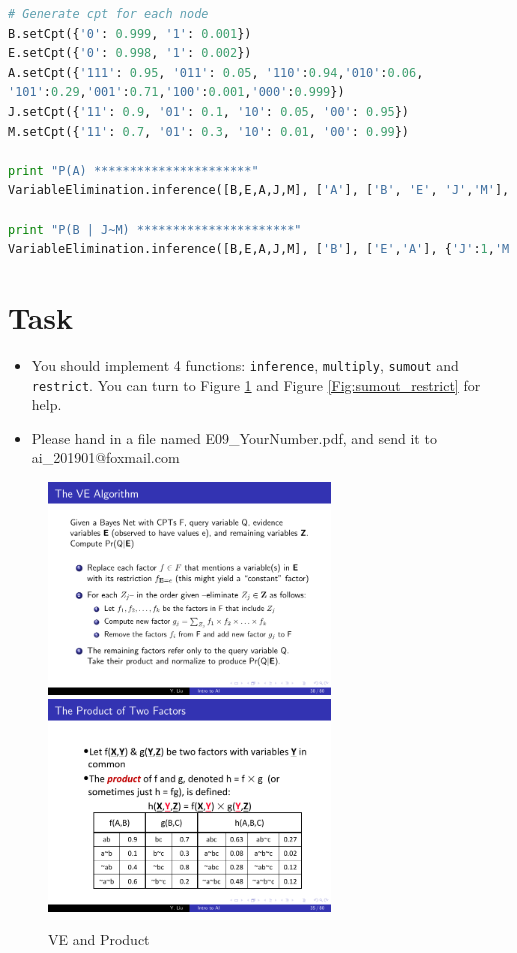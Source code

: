 \documentclass[a4paper, 11pt]{article}
\begin{document}
\begin{lstlisting}[language=Python,frame=single]
# Generate cpt for each node
B.setCpt({'0': 0.999, '1': 0.001})
E.setCpt({'0': 0.998, '1': 0.002})
A.setCpt({'111': 0.95, '011': 0.05, '110':0.94,'010':0.06,
'101':0.29,'001':0.71,'100':0.001,'000':0.999})
J.setCpt({'11': 0.9, '01': 0.1, '10': 0.05, '00': 0.95})
M.setCpt({'11': 0.7, '01': 0.3, '10': 0.01, '00': 0.99})

print "P(A) **********************"
VariableElimination.inference([B,E,A,J,M], ['A'], ['B', 'E', 'J','M'], {})

print "P(B | J~M) **********************"
VariableElimination.inference([B,E,A,J,M], ['B'], ['E','A'], {'J':1,'M':0})
\end{lstlisting}
\section{Task}
\begin{itemize}
\item You should implement 4 functions: \texttt{inference}, \texttt{multiply}, \texttt{sumout} and \texttt{restrict}. You can turn to Figure \ref{Fig:ve_product} and Figure \ref{Fig:sumout_restrict} for help. 
\item Please hand in a file named \textsf{E09\_YourNumber.pdf}, and send it to \textsf{ai\_201901@foxmail.com}
\end{itemize}


\begin{figure}[ht]{}
\centering
\includegraphics[width=7.5cm]{Pic/ve}
\qquad
\includegraphics[width=7.5cm]{Pic/product}
\caption{VE and Product}
\label{Fig:ve_product}
\end{figure}
\end{document}
